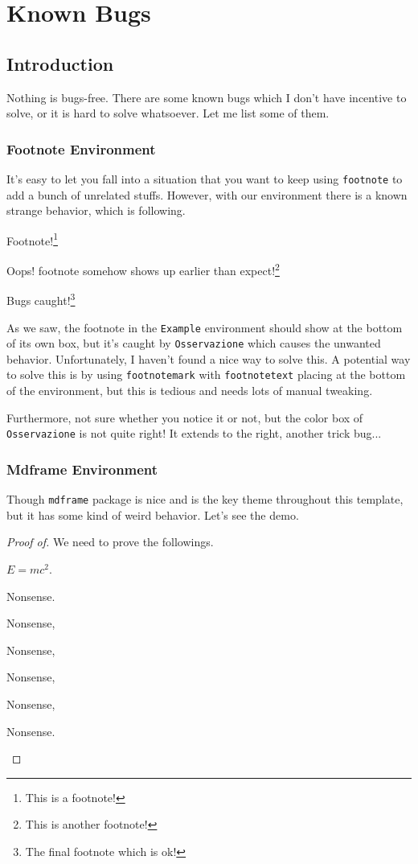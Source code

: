 \chapter{Known Bugs}

\section{Introduction}
Nothing is bugs-free. There are some known bugs which I don't have incentive to solve, or it is hard to solve whatsoever. Let me list some of them.

\subsection{Footnote Environment}
It's easy to let you fall into a situation that you want to keep using \texttt{footnote} to add a bunch of unrelated stuffs. However, with our environment there is a known strange behavior, which is following.
\begin{es}
	Footnote!\footnote{This is a footnote!}
	\begin{osservazione}
		Oops! footnote somehow shows up earlier than expect!\footnote{This is another footnote!}
	\end{osservazione}

	Bugs caught!\footnote{The final footnote which is ok!}
\end{es}

As we saw, the footnote in the \texttt{Example} environment should show at the bottom of its own box, but it's caught by \texttt{Osservazione} which causes the unwanted behavior. Unfortunately, I haven't found a nice way to solve this. A potential way to solve this is by using \texttt{footnotemark} with \texttt{footnotetext} placing at the bottom of the environment, but this is tedious and needs lots of manual tweaking.

Furthermore, not sure whether you notice it or not, but the color box of \texttt{Osservazione} is not quite right! It extends to the right, another trick bug...

\subsection{Mdframe Environment}
Though \texttt{mdframe} package is nice and is the key theme throughout this template, but it has some kind of weird behavior. Let's see the demo.
\begin{proof}[Proof of]
	We need to prove the followings.
	\begin{affermazione}
		\(E = mc^{2} \).
	\end{affermazione}
	\begin{spiegaz}

		Nonsense.

		Nonsense,

		Nonsense,

		Nonsense,

		Nonsense,

		Nonsense.
	\end{spiegaz}

\end{proof}

